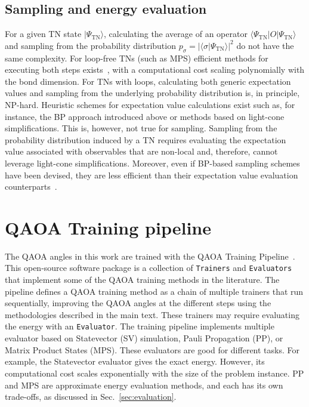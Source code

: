 \documentclass[twocolumn,
english,
aps,
pra,
10pt,
longbibliography,
superscriptaddress,
amsmath,
amssymb,
floatfix
]{revtex4-2}
\begin{document}
{\subsection{Sampling and energy evaluation}
\label{app:tn_sample}

For a given TN state $\vert \Psi_\text{TN} \rangle$, calculating the average of an operator $\langle \Psi_\text{TN} \vert O \vert \Psi_\text{TN} \rangle$ and sampling from the probability distribution $p_{\sigma} = \left| \langle \sigma \vert \Psi_\text{TN} \rangle \right|^2$ do not have the same complexity.
For loop-free TNs (such as MPS) efficient methods for executing both steps exists~\cite{Vidal2012_PerfectSampling}, with a computational cost scaling polynomially with the bond dimension.
For TNs with loops, calculating both generic expectation values and sampling from the underlying probability distribution is, in principle, NP-hard.
Heuristic schemes for expectation value calculations exist such as, for instance, the BP approach introduced above or methods based on light-cone simplifications.
This is, however, not true for sampling.
Sampling from the probability distribution induced by a TN requires evaluating the expectation value associated with observables that are non-local and, therefore, cannot leverage light-cone simplifications.
Moreover, even if BP-based sampling schemes have been devised, they are less efficient than their expectation value evaluation counterparts~\cite{Luchnikov2024_BP-Annealing,Rudolph2025_BP-QuantumCircuit}.

\section{QAOA Training pipeline \label{app:training_pipeline}}


The QAOA angles in this work are trained  with the QAOA Training Pipeline~\cite{training_pipeline}.
This open-source software package is a collection of \texttt{Trainers} and \texttt{Evaluators} that implement some of the QAOA training methods in the literature.
The pipeline defines a QAOA training method as a chain of multiple trainers that run sequentially, improving the QAOA angles at the different steps using the methodologies described in the main text. 
These trainers may require evaluating the energy with an \texttt{Evaluator}.
The training pipeline implements multiple evaluator based on Statevector (SV) simulation, Pauli Propagation (PP), or Matrix Product States (MPS).
These evaluators are good for different tasks. 
For example, the Statevector evaluator gives the exact energy.
However, its computational cost scales exponentially with the size of the problem instance. 
PP and MPS are approximate energy evaluation methods, and each has its own trade-offs, as discussed in Sec.~\ref{sec:evaluation}.

}
\end{document}
